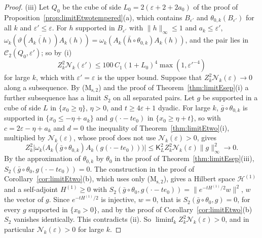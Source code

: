 \documentclass[aps,prd,twocolumn,superscriptaddress,nofootinbib,longbibliography,floatfix,amsmath,amssymb,10pt]{revtex4-2}
\theoremstyle{definition}
\theoremstyle{remark}
\begin{document}
\begin{proof}
(iii) Let $Q_0$ be the cube of side $L_0=2(\varepsilon+2+2a_0)$ of the proof
of Proposition~\ref{prop:limitEtwotempered}(a), which contains
$B_{\varepsilon'}$ and $\theta_{0,k}(B_{\varepsilon'})$ for all $k$ and
$\varepsilon'\le\varepsilon$. For $h$ supported in $B_{\varepsilon'}$ with
$\|h\|_\infty\le1$ and $a_k\le\varepsilon'$, $\omega_k(\vartheta(\overline{
A_k(h)})A_k(h))=\omega_k(A_k(\bar h\circ\theta_{0,k})A_k(h))$, and the pair
lies in $\mathcal C_2(Q_0,\varepsilon')$; so by (i)
\[
Z_k^2\mathcal N_k(\varepsilon')\le100\,C_1(1+L_0)^4\max(1,\varepsilon'^{-4})
\]
for large $k$, which with $\varepsilon'=\varepsilon$ is the upper bound.
Suppose that $Z_k^2\mathcal N_k(\varepsilon)\to0$ along a subsequence. By
(M$_{\mathrm s,2}$) and the proof of Theorem~\ref{thm:limitEsep}(i) a further
subsequence has a limit $S_2$ on all separated pairs. Let $g$ be supported in
a cube of side $L$ in $\{x_0\ge\eta\}$, $\eta>0$, and $t\ge4\varepsilon+1$
dyadic. For large $k$, $\bar g\circ\theta_{0,k}$ is supported in $\{x_0\le
-\eta+a_k\}$ and $g(\cdot-te_0)$ in $\{x_0\ge\eta+t\}$, so with $c=2
\varepsilon-\eta+a_k$ and $d=0$ the inequality of
Theorem~\ref{thm:limitEtwo}(i), multiplied by $\mathcal N_k(\varepsilon)$,
whose proof does not use $\mathcal N_k(\varepsilon)>0$, gives
\[
Z_k^2\bigl|\omega_k\bigl(A_k(\bar g\circ\theta_{0,k})A_k(g(\cdot-te_0))
\bigr)\bigr|\le\mathsf K_L^2Z_k^2\mathcal N_k(\varepsilon)\|g\|_\infty^2\to0 .
\]
By the approximation of $\theta_{0,k}$ by $\theta_0$ in the proof of
Theorem~\ref{thm:limitEsep}(iii), $S_2(\bar g\circ\theta_0,g(\cdot-te_0))=0$.
The construction in the proof of Corollary~\ref{cor:limitEtwo}(b), which
uses only (M$_{\mathrm s,2}$), gives a Hilbert space $\mathcal H^{(1)}$ and
a self-adjoint $H^{(1)}\ge0$ with $S_2(\bar g\circ\theta_0,g(\cdot-te_0))=
\|e^{-tH^{(1)}/2}w\|^2$, $w$ the vector of $g$. Since $e^{-tH^{(1)}/2}$ is
injective, $w=0$, that is $S_2(\bar g\circ\theta_0,g)=0$, for every $g$
supported in $\{x_0>0\}$, and by the proof of Corollary~\ref{cor:limitEtwo}(b)
$S_2$ vanishes identically. This contradicts (ii). So $\liminf_kZ_k^2
\mathcal N_k(\varepsilon)>0$, and in particular $\mathcal N_k(\varepsilon)
>0$ for large $k$.


\end{proof}
\end{document}

